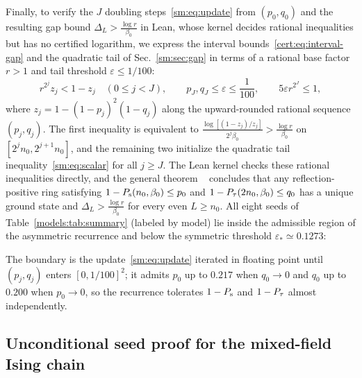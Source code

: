 Finally, to verify the $J$ doubling steps~\eqref{sm:eq:update} from
$(p_0,q_0)$ and the resulting gap bound $\Delta_L>\tfrac{\log r}{\beta_0}$ in
Lean, whose kernel decides rational inequalities but has no certified
logarithm, we express the
interval bounds~\eqref{cert:eq:interval-gap} and the quadratic tail
of Sec.~\ref{sm:sec:gap} in terms of a rational base factor $r>1$ and
tail threshold $\varepsilon\le1/100$:
\begin{equation}
    r^{2^j}z_j<1-z_j\quad(0\le j<J),\qquad
    p_J,q_J\le\varepsilon\le\frac1{100},\qquad
    5\varepsilon r^{2^J}\le1,
    \label{models:eq:chain-cert}
\end{equation}
where $z_j=1-(1-p_j)^2(1-q_j)$ along the upward-rounded rational
sequence $(p_j,q_j)$. The first inequality is equivalent to
$\tfrac{\log[(1-z_j)/z_j]}{2^j\beta_0}>\tfrac{\log r}{\beta_0}$ on $[2^jn_0,2^{j+1}n_0]$,
and the remaining two initialize the quadratic tail
inequality~\eqref{sm:eq:scalar} for all $j\ge J$. The Lean kernel checks these rational
inequalities directly, and the general theorem%
~
concludes that any reflection-positive ring satisfying
$1-P_{\mathrm s}(n_0,\beta_0)\le p_0$ and $1-P_{\tau}(2n_0,\beta_0)\le q_0$ has a unique
ground state and $\Delta_L>\tfrac{\log r}{\beta_0}$ for every even $L\ge n_0$.
All eight seeds of Table~\ref{models:tab:summary} (labeled by model) lie
inside the admissible region of the asymmetric recurrence and below the
symmetric threshold $\varepsilon_*\simeq0.1273$:
\begin{proofdiagram}
    \seedscatter
\end{proofdiagram}
The boundary is the update~\eqref{sm:eq:update} iterated in floating
point until $(p_j,q_j)$ enters $[0,1/100]^2$; it admits $p_0$ up to
$0.217$ when $q_0\to0$ and $q_0$ up to $0.200$ when $p_0\to0$, so the
recurrence tolerates $1-P_{\mathrm s}$ and $1-P_{\tau}$ almost independently.

\subsection{Unconditional seed proof for the mixed-field Ising chain}
\label{models:sec:ising}

